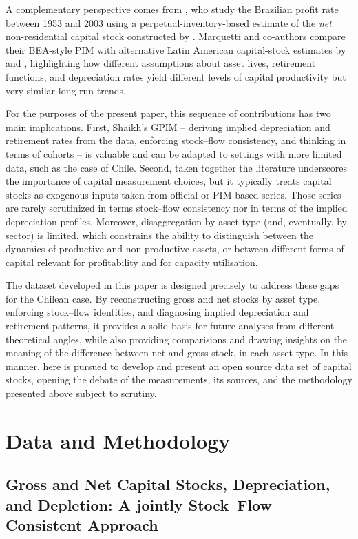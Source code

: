 \documentclass[11pt,a4paper]{article}
\begin{document}
A complementary perspective comes from \citet{Marquetti2010}, who study the Brazilian profit rate between 1953 and 2003 using a perpetual-inventory-based estimate of the \emph{net} non-residential capital stock constructed by \citet{Mesquita2005}. Marquetti and co-authors compare their BEA-style PIM with alternative Latin American capital-stock estimates by \citet{Hofman2000} and \citet{Morandi2004}, highlighting how different assumptions about asset lives, retirement functions, and depreciation rates yield different levels of capital productivity but very similar long-run trends. 

For the purposes of the present paper, this sequence of contributions has two main implications.  First, Shaikh's GPIM -- deriving implied depreciation and retirement rates from the data,  enforcing stock--flow consistency, and thinking in terms of cohorts -- is valuable and can be  adapted to settings with more limited data, such as the case of Chile.  Second, taken together the literature underscores the importance of capital measurement choices, but it typically treats capital stocks as exogenous inputs taken from official or PIM-based series. Those series are rarely scrutinized in terms stock--flow consistency nor in terms of the implied depreciation profiles. Moreover, disaggregation by asset type (and, eventually, by sector) is limited, which constrains the ability to distinguish between the dynamics of productive and non-productive assets, or between different forms of capital relevant for profitability and for capacity utilisation.

The dataset developed in this paper is designed precisely to address these gaps for the Chilean case. By reconstructing gross and net stocks by asset type, enforcing stock--flow identities, and diagnosing implied depreciation and retirement patterns, it provides a solid basis for future analyses from different theoretical angles, while also providing comparisions and drawing insights on the meaning of the difference between net and gross stock, in each asset type. In this manner, here is pursued to develop and present an open source data set of capital stocks, opening the debate of the measurements, its sources,  and the methodology presented above subject to scrutiny. 

\section{Data and Methodology}
\label{methodology}

\subsection{Gross and Net Capital Stocks, Depreciation, and Depletion: A jointly Stock--Flow Consistent Approach}
\end{document}

